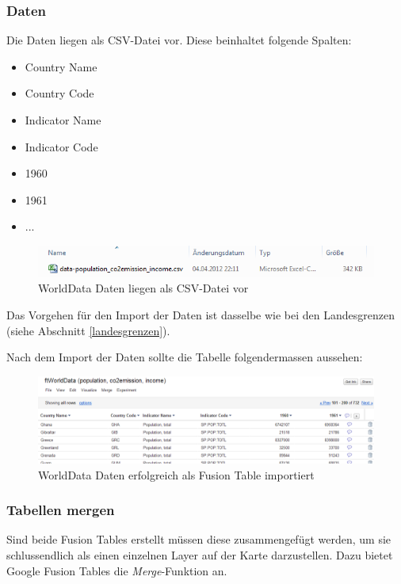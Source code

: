 \subsubsection{Daten}
Die Daten liegen als CSV-Datei vor. Diese beinhaltet folgende Spalten:
\begin{itemize}
\item Country Name
\item Country Code
\item Indicator Name
\item Indicator Code
\item 1960
\item 1961
\item ...
\end{itemize}

\begin{figure}[H]
	\centering
	\includegraphics{images/usecase1-worlddata/documentation/worlddata-data_csv.png}
	\caption{WorldData Daten liegen als CSV-Datei vor}
	\label{worlddata-data_csv}
\end{figure}

Das Vorgehen für den Import der Daten ist dasselbe wie bei den Landesgrenzen (siehe Abschnitt \ref{landesgrenzen}).

Nach dem Import der Daten sollte die Tabelle folgendermassen aussehen:

\begin{figure}[H]
	\centering
	\includegraphics[scale=0.5]{images/usecase1-worlddata/documentation/worlddata-data_import_done.png}
	\caption{WorldData Daten erfolgreich als Fusion Table importiert}
	\label{worlddata-data_import_done}
\end{figure}

\subsubsection{Tabellen mergen}
Sind beide Fusion Tables erstellt müssen diese zusammengefügt werden, um sie schlussendlich als einen einzelnen Layer auf der Karte darzustellen. Dazu bietet Google Fusion Tables die \emph{Merge}-Funktion an. 

